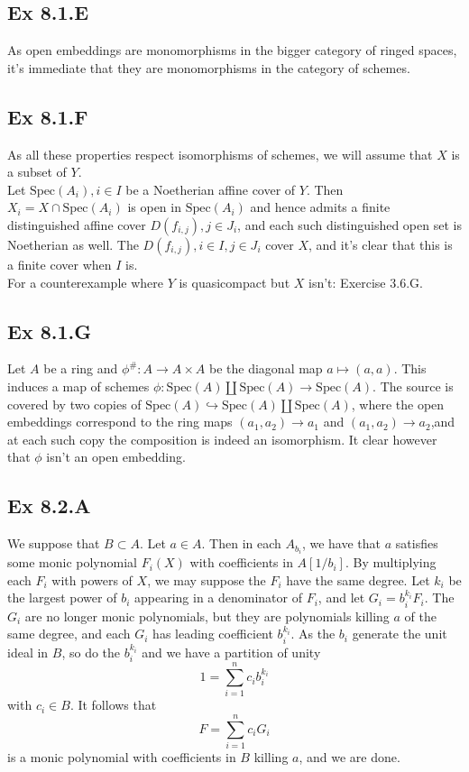 \documentclass{article}
\theoremstyle{definition}
\newcommand{\Spec}{\text{Spec}}
\begin{document}
\subsection*{Ex 8.1.E}

As open embeddings are monomorphisms in the bigger category of ringed spaces,
it's immediate that they are monomorphisms in the category of schemes.

\subsection*{Ex 8.1.F}

As all these properties respect isomorphisms of schemes, we will assume that
$X$ is a subset of $Y$. \\

Let $\Spec(A_i), i \in I$ be a Noetherian affine cover of $Y$. Then $X_i = X
	\cap \Spec(A_i)$ is open in $\Spec(A_i)$ and hence admits a finite
distinguished affine cover $D(f_{i,j}), j \in J_i$, and each such distinguished
open set is Noetherian as well. The $D(f_{i, j}), i \in I, j \in J_i$ cover
$X$, and it's clear that this is a finite cover when $I$ is. \\

For a counterexample where $Y$ is quasicompact but $X$ isn't: Exercise 3.6.G.

\subsection*{Ex 8.1.G}

Let $A$ be a ring and $\phi^{\#} : A \to A \times A$ be the diagonal map $a
	\mapsto (a, a)$. This induces a map of schemes $\phi : \Spec(A) \coprod
	\Spec(A) \to \Spec(A)$. The source is covered by two copies of $\Spec(A)
	\hookrightarrow \Spec(A) \coprod \Spec(A)$, where the open embeddings
correspond to the ring maps $(a_{1}, a_{2}) \to a_{1}$ and $(a_{1}, a_{2}) \to
	a_{2}$,and at each such copy the composition is indeed an isomorphism. It clear
however that $\phi$ isn't an open embedding.

\subsection*{Ex 8.2.A}

We suppose that $B \subset A$. Let $a \in A$. Then in each $A_{b_i}$, we have
that $a$ satisfies some monic polynomial $F_i(X)$ with coefficients in
$A[1/b_i]$. By multiplying each $F_i$ with powers of $X$, we may suppose the
$F_i$ have the same degree. Let $k_i$ be the largest power of $b_i$ appearing
in a denominator of $F_i$, and let $G_i = b_i^{k_i} F_i$. The $G_i$ are no
longer monic polynomials, but they are polynomials killing $a$ of the same
degree, and each $G_i$ has leading coefficient $b_i^{k_i}$. As the $b_i$
generate the unit ideal in $B$, so do the $b_i^{k_i}$ and we have a partition
of unity
\[
	1 = \sum_{i = 1}^{n} c_i b_i^{k_i}
\]
with $c_i \in B$. It follows that
\[
	F = \sum_{i = 1}^{n} c_i G_i
\]
is a monic polynomial with coefficients in $B$ killing $a$, and we are done.
\end{document}
